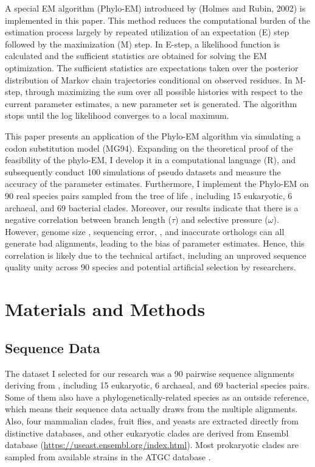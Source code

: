 A special EM algorithm (Phylo-EM) introduced by (Holmes and Rubin, 2002) is implemented in this paper. This method reduces the computational burden of the estimation process largely by repeated utilization of an expectation (E) step followed by the maximization (M) step. In E-step, a likelihood function is calculated and the sufficient statistics are obtained for solving the EM optimization. The sufficient statistics are expectations taken over the posterior distribution of Markov chain trajectories conditional on observed residues. In M-step, through maximizing the sum over all possible histories with respect to the current parameter estimates, a new parameter set is generated. The algorithm stops until the log likelihood converges to a local maximum.   

This paper presents an application of the Phylo-EM algorithm via simulating a codon substitution model (MG94). Expanding on the theoretical proof of the feasibility of the phylo-EM, I develop it in a computational language (R), and subsequently conduct 100 simulations of pseudo datasets and measure the accuracy of the parameter estimates. Furthermore, I implement the Phylo-EM on 90 real species pairs sampled from the tree of life \parencite{zou2021nonsynonymous}, including 15 eukaryotic, 6 archaeal, and 69 bacterial clades. Moreover, our results indicate that there is a negative correlation between branch length ($\tau$) and selective pressure ($\omega$). However, genome size \parencite{simpson2014exploring}, sequencing error, \parencite{schneider2009estimates}, and inaccurate orthologs can all generate bad alignments, leading to the bias of parameter estimates.  Hence, this correlation is likely due to the technical artifact, including an unproved sequence quality unity across 90 species and potential artificial selection by researchers.


\section{Materials and Methods}
\subsection{Sequence Data}
The dataset I selected for our research was a 90 pairwise sequence alignments deriving from \cite{zou2021nonsynonymous}, including 15 eukaryotic, 6 archaeal, and 69 bacterial species pairs. Some of them also have a phylogenetically-related species as an outside reference, which means their sequence data actually draws from the multiple alignments. Also, four mammalian clades, fruit flies, and yeasts are extracted directly from distinctive databases, and other eukaryotic clades are derived from Ensembl database (\href{https://useast.ensembl.org/index.html}{https://useast.ensembl.org/index.html}). Most prokaryotic clades are sampled from available strains in the ATGC database \parencite{kristensen2016atgc}.


